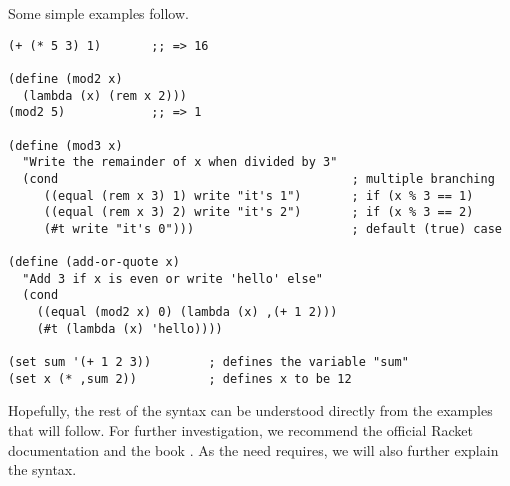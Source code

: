 Some simple examples follow.
{
  \small
\begin{verbatim}
(+ (* 5 3) 1)       ;; => 16

(define (mod2 x)
  (lambda (x) (rem x 2)))
(mod2 5)            ;; => 1

(define (mod3 x)
  "Write the remainder of x when divided by 3"
  (cond                                         ; multiple branching
     ((equal (rem x 3) 1) write "it's 1")       ; if (x % 3 == 1)
     ((equal (rem x 3) 2) write "it's 2")       ; if (x % 3 == 2)
     (#t write "it's 0")))                      ; default (true) case

(define (add-or-quote x)
  "Add 3 if x is even or write 'hello' else"
  (cond
    ((equal (mod2 x) 0) (lambda (x) ,(+ 1 2)))
    (#t (lambda (x) 'hello))))

(set sum '(+ 1 2 3))        ; defines the variable "sum"
(set x (* ,sum 2))          ; defines x to be 12
\end{verbatim}
}

\vspace{0.3cm}

Hopefully, the rest of the syntax can be understood directly from
the examples that will follow. For further investigation, we recommend
the official Racket documentation \cite{racket} and the book
\cite{htdp}. As the need requires, we will also further explain the syntax.

